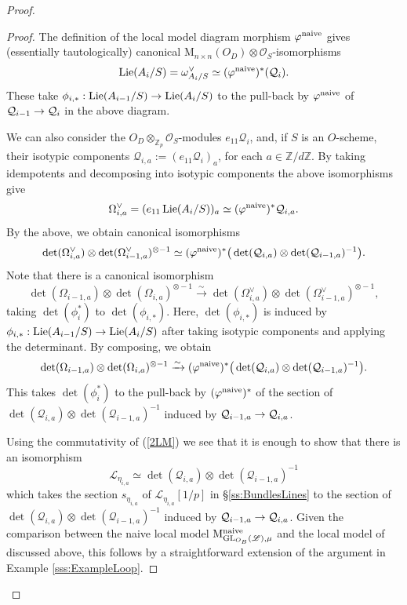 \documentclass[reqno, 10pt]{amsart}
\makeatletter
\newcommand{\BZ}{\ensuremath{\mathbb {Z}}\xspace}
\newcommand{\CL}{\ensuremath{\mathcal {L}}\xspace}
\newcommand{\CO}{\ensuremath{\mathcal {O}}\xspace}
\newcommand{\CQ}{\ensuremath{\mathcal {Q}}\xspace}
\newcommand{\RM}{\ensuremath{\mathrm {M}}\xspace}
\newcommand{\GL}{\mathrm{GL}}
\DeclareMathOperator{\Lie}{Lie}
\theoremstyle{definition}
\numberwithin{equation}{subsection}
\numberwithin{subsubsection}{subsection}
\renewcommand{\to}{%
   \ifbool{@display}{\longrightarrow}{\rightarrow}%
   }
\newcommand{\Mloc}{{\rm M}}
\makeatother
\begin{document}
\begin{proof}
\begin{proof}
        
    The definition of the local model diagram morphism $\varphi^{\rm naive}$ gives (essentially tautologically)  canonical $\RM_{n\times n}(O_D)\otimes \CO_S$-isomorphisms
    \[
   \Lie(A_i/S)= \omega^\vee_{A_i/S}\simeq (\varphi^{\rm naive})^*(\CQ_i).
    \]
    These take $\phi_{i,*}:  \Lie(A_{i-1}/S)\to  \Lie(A_{i}/S)$ to the pull-back by $\varphi^{\rm naive}$ of 
    $\CQ_{i-1}\to \CQ_i$ in the above diagram.  
    
    We can also consider the $O_D\otimes_{\BZ_p}\CO_S$-modules $ e_{11}\CQ_{i}$, and, if $S$ is an $O$-scheme, their isotypic components $\CQ_{i, a}:=(e_{11}\CQ_i)_a$, for each $a\in \BZ/d\BZ$. By taking idempotents and decomposing into isotypic components the above isomorphisms give
    \[
       \Omega_{i, a}^\vee = (e_{11}\Lie(A_i/S))_a\simeq (\varphi^{\rm naive})^* \CQ_{i,a}.
    \]
   By the above, we obtain canonical isomorphisms
   \[
  \det(\Omega_{i,a}^\vee)\otimes \det(\Omega^\vee_{i-1,a} )^{\otimes -1}  \simeq (\varphi^{\rm naive})^*\big(\det(\CQ_{i,a})\otimes \det(\CQ_{i-1,a})^{-1}\big).
   \]
   Note that there is a canonical isomorphism
   \[
 \det(\Omega_{i-1,a})\otimes \det(\Omega_{i,a} )^{\otimes -1}    \xrightarrow{\sim}   \det(\Omega_{i,a}^\vee)\otimes \det(\Omega^\vee_{i-1,a} )^{\otimes -1},
  \]
  taking $\det(\phi_i^*)$ to $\det(\phi_{i,*})$. Here, $\det(\phi_{i,*})$ is induced by $\phi_{i,*}:  \Lie(A_{i-1}/S)\to  \Lie(A_{i}/S)$
  after taking isotypic components and applying the determinant. By composing, we obtain 
     \[
 \det(\Omega_{i-1,a})\otimes \det(\Omega_{i,a} )^{\otimes -1}   \xrightarrow{\sim}  (\varphi^{\rm naive})^*\big(\det(\CQ_{i,a})\otimes \det(\CQ_{i-1,a})^{-1}\big).
   \]
This takes  $\det(\phi_i^*)$ to the pull-back by $(\varphi^{\rm naive})^*$ of the section of $\det(\CQ_{i,a})\otimes \det(\CQ_{i-1,a})^{-1}$ induced by  $\CQ_{i-1,a }\to \CQ_{i,a}$.
  
 Using the commutativity of (\ref{2LM}) we see that it is enough to show that there 
 is an isomorphism
 \[
 \CL_{\eta_{i,a}}\simeq \det(\CQ_{i,a})\otimes \det(\CQ_{i-1,a})^{-1}
 \]
 which takes the section $s_{\eta_{i,a}}$ of  $\CL_{\eta_{i,a}}[1/p]$  in \S \ref{ss:BundlesLines} to the   section of  $\det(\CQ_{i,a})\otimes \det(\CQ_{i-1,a})^{-1}$
  induced by  $\CQ_{i-1,a }\to \CQ_{i,a}$. Given the comparison between the naive local model $\Mloc^{\rm naive}_{\GL_{O_B}(\mathscr L),\mu}$ and the local model of \cite{PZ} discussed above, this follows by a straightforward extension of 
  the argument in Example \ref{sss:ExampleLoop}.
   \end{proof}
   

\end{proof}
\end{document}
